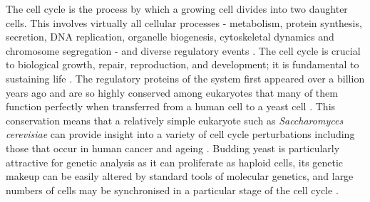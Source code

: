 \documentclass[]{article}
\begin{document}
The cell cycle is the process by which a growing cell divides into two daughter cells. This involves virtually all cellular processes - metabolism, protein synthesis, secretion, DNA replication, organelle biogenesis, cytoskeletal dynamics and chromosome segregation - and diverse regulatory events \citep{granovskaia2010high}. The cell cycle is crucial to biological growth, repair, reproduction, and development; it is fundamental to sustaining life \citep{tyson2013cell, chen2004integrative, alberts2018molecular}. The regulatory proteins of the system first appeared over a billion years ago and are so highly conserved among eukaryotes that many of them function perfectly when transferred from a human cell to a yeast cell \citep{alberts2018molecular}. This conservation means that a relatively simple eukaryote such as \emph{Saccharomyces cerevisiae} can provide insight into a variety of cell cycle perturbations including those that occur in human cancer \citep{ingalls2007systems, chen2004integrative} and ageing \citep{jimenez2015live}. Budding yeast is particularly attractive for genetic analysis as it can proliferate as haploid cells, its genetic makeup can be easily altered by standard tools of molecular genetics, and large numbers of cells may be synchronised in a particular stage of the cell cycle  \citep{tyson2013cell, juanes2017methods}.



\end{document}
